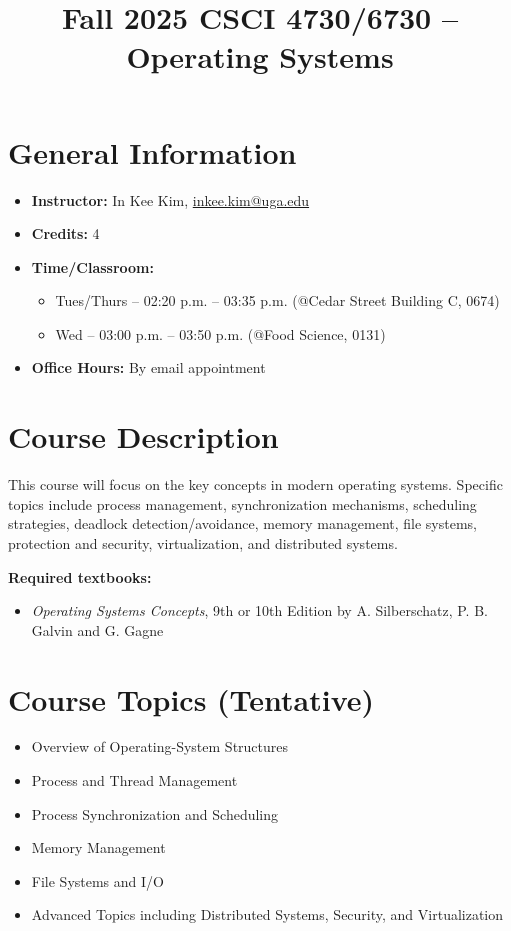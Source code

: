 \documentclass[11pt,letterpaper]{article}
\title{\textbf{Fall 2025 CSCI 4730/6730 -- Operating Systems}}
\author{}
\date{}
\begin{document}
\maketitle

\section*{General Information}

\begin{itemize}[leftmargin=1cm]
    \item \textbf{Instructor:} In Kee Kim, \href{mailto:inkee.kim@uga.edu}{inkee.kim@uga.edu}
    \item \textbf{Credits:} 4
    \item \textbf{Time/Classroom:}
    \begin{itemize}[leftmargin=1cm]
        \item Tues/Thurs -- 02:20 p.m. -- 03:35 p.m. (@Cedar Street Building C, 0674)
        \item Wed -- 03:00 p.m. -- 03:50 p.m. (@Food Science, 0131)
    \end{itemize}
    \item \textbf{Office Hours:} By email appointment
\end{itemize}

\section*{Course Description}

This course will focus on the key concepts in modern operating systems. Specific topics include process management, synchronization mechanisms, scheduling strategies, deadlock detection/avoidance, memory management, file systems, protection and security, virtualization, and distributed systems.

\vspace{0.5cm}
\noindent
\textbf{Required textbooks:}
\begin{itemize}[leftmargin=1cm]
    \item \textit{Operating Systems Concepts}, 9th or 10th Edition by A. Silberschatz, P. B. Galvin and G. Gagne
\end{itemize}

\section*{Course Topics (Tentative)}

\begin{itemize}[leftmargin=1cm]
    \item Overview of Operating-System Structures
    \item Process and Thread Management
    \item Process Synchronization and Scheduling
    \item Memory Management
    \item File Systems and I/O
    \item Advanced Topics including Distributed Systems, Security, and Virtualization
\end{itemize}
\end{document}
